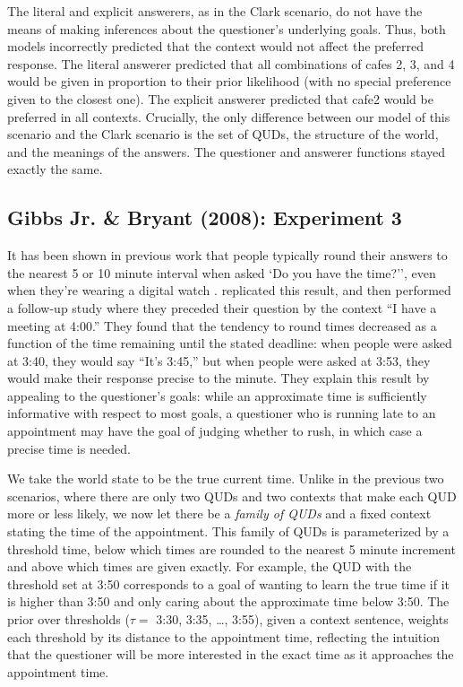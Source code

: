 \documentclass[12pt, floatsintext, man]{apa6}
\begin{document}
The literal and explicit answerers, as in the Clark scenario, do not have the means of making inferences about the questioner's underlying goals. Thus, both models incorrectly predicted that the context would not affect the preferred response. The literal answerer predicted that all combinations of cafes 2, 3, and 4 would be given in proportion to their prior likelihood (with no special preference given to the closest one). The explicit answerer predicted that cafe2 would be preferred in all contexts.     Crucially, the only difference between our model of this scenario and the Clark scenario is the set of QUDs, the structure of the world, and the meanings of the answers. The questioner and answerer functions stayed exactly the same.

\subsection{Gibbs Jr. \& Bryant (2008): Experiment 3}

It has been shown in previous work that people typically round their answers to the nearest 5 or 10 minute interval when asked `Do you have the time?'', even when they're wearing a digital watch \cite{DerHenstCarlesSperber02_RelevanceTellingTime}.   replicated this result, and then performed a follow-up study where they preceded their question by the context ``I have a meeting at 4:00.'' They found that the tendency to round times decreased as a function of the time remaining until the stated deadline: when people were asked at 3:40, they would say ``It's 3:45,'' but when people were asked at 3:53, they would make their response precise to the minute. They explain this result by appealing to the questioner's goals: while an approximate time is sufficiently informative with respect to most goals, a questioner who is running late to an appointment may have the goal of judging whether to rush, in which case a precise time is needed. 

We take the world state to be the true current time. Unlike in the previous two scenarios, where there are only two QUDs and two contexts that make each QUD more or less likely, we now let there be a \emph{family of QUDs} and a fixed context stating the time of the appointment. This family of QUDs is parameterized by a threshold time, below which times are rounded to the nearest 5 minute increment and above which times are given exactly. For example, the QUD with the threshold set at 3:50 corresponds to a goal of wanting to learn the true time if it is higher than 3:50 and only caring about the approximate time below 3:50. The prior over thresholds ($\tau =$ 3:30, 3:35, \dots, 3:55), given a context sentence, weights each threshold by its distance to the appointment time, reflecting the intuition that the questioner will be more interested in the exact time as it approaches the appointment time.
\end{document}
